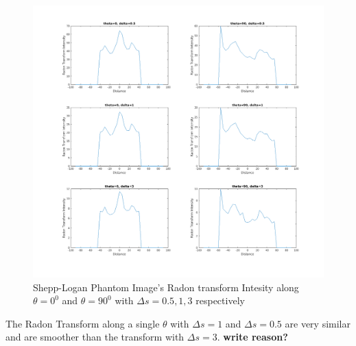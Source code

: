 \documentclass[11pt]{article}
\begin{document}
\begin{figure}[h]
\centering
\includegraphics[scale=0.4]{c2}
\caption{Shepp-Logan Phantom Image's Radon transform Intesity along $\theta=0^{0} $ and $\theta=90^{0} $ with $\Delta s = 0.5,1,3$ respectively}
\end{figure}
The Radon Transform along a single $\theta$ with $\Delta s=1$ and $\Delta s=0.5$ are very similar and are smoother than the transform with $\Delta s=3$. 
\textbf{write reason?}
\end{document}
